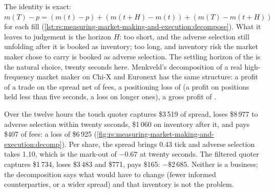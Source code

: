 The identity is exact: $m(T) - p = (m(t) - p) + (m(t+H) - m(t)) + (m(T) - m(t+H))$ for each fill (\cref{lst:rs:measuring-market-making-and-execution:decompose}).
What it leaves to judgement is the horizon $H$: too short, and the adverse selection still unfolding after it is booked as inventory; too long, and inventory
risk the market maker chose to carry is booked as adverse selection. The settling horizon of the  is the natural choice, twenty seconds here.
Menkveld's decomposition of a real high-frequency market maker on Chi-X and Euronext has the same structure: a profit of  a trade on the spread net
of fees, a positioning loss of  (a profit on positions held less than five seconds, a loss on longer ones), a gross profit of .

\begin{omfigure}

\label{fig:rs:measuring-market-making-and-execution:decomp}
\end{omfigure}

Over the twelve hours the touch quoter captures \$3\,519 of spread, loses \$8\,977 to adverse selection within twenty seconds, \$1\,060 on inventory after it, and
pays \$407 of fees: a loss of \$6\,925 (\cref{fig:rs:measuring-market-making-and-execution:decomp}). Per share, the spread brings 0.43 tick and adverse selection
takes 1.10, which is the mark-out of $-0.67$ at twenty seconds. The filtered quoter captures \$1\,734, loses \$3\,483 and \$771, pays \$165: $-\$2\,685$. Neither
is a business; the decomposition says what would have to change (fewer informed counterparties, or a wider spread) and that inventory is not the problem.

